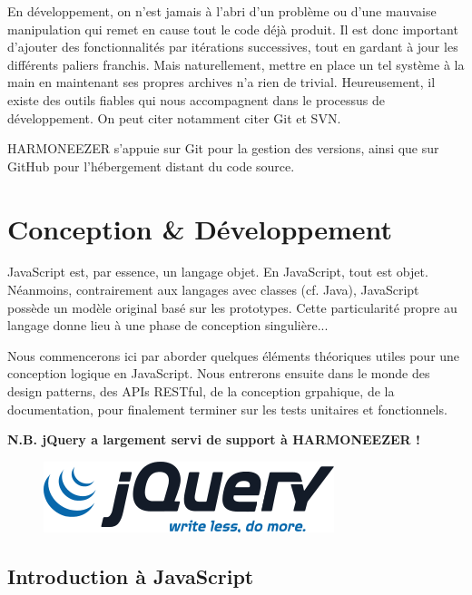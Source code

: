 \documentclass[a4paper,12pt]{article}
\begin{document}
En développement, on n'est jamais à l'abri d'un problème ou d'une mauvaise manipulation qui remet en cause tout le code déjà produit. Il est donc important d'ajouter des fonctionnalités par itérations successives, tout en gardant à jour les différents paliers franchis. Mais naturellement, mettre en place un tel système à la main en maintenant ses propres archives n'a rien de trivial. Heureusement, il existe des outils fiables qui nous accompagnent dans le processus de développement. On peut citer notamment citer Git et SVN.

HARMONEEZER s'appuie sur Git pour la gestion des versions, ainsi que sur GitHub pour l'hébergement distant du code source.

\section{Conception \& Développement}

JavaScript est, par essence, un langage objet. En JavaScript, tout est objet. Néanmoins, contrairement aux langages avec classes (cf. Java), JavaScript possède un modèle original basé sur les prototypes. Cette particularité propre au langage donne lieu à une phase de conception singulière...

Nous commencerons ici par aborder quelques éléments théoriques utiles pour une conception logique en JavaScript. Nous entrerons ensuite dans le monde des design patterns, des APIs RESTful, de la conception grpahique, de la documentation, pour finalement terminer sur les tests unitaires et fonctionnels.

\textbf{N.B. jQuery a largement servi de support à HARMONEEZER !}

\begin{figure}[!h]
  \begin{center}
    \includegraphics[scale=0.3]{logo-jquery.png}
  \end{center}
\end{figure}

\subsection{Introduction à JavaScript}
\end{document}
